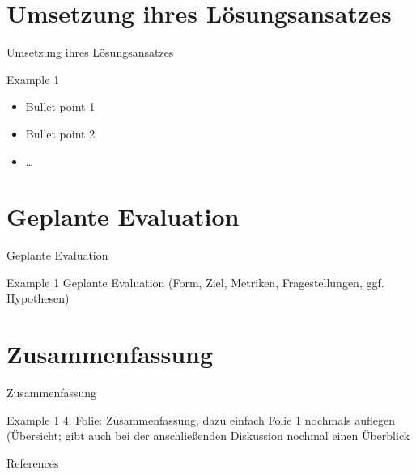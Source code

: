 \documentclass[18pt]{beamer}
\begin{document}
\section{Umsetzung ihres Lösungsansatzes}
\begin{frame}{Umsetzung ihres Lösungsansatzes}
\begin{exampleblock}{Example 1}
\begin{itemize}
\item Bullet point 1
\item Bullet point 2
\item \dots
\end{itemize}
\end{exampleblock}
\end{frame}


\section{Geplante Evaluation}
\begin{frame}{Geplante Evaluation}
\begin{exampleblock}{Example 1}
Geplante Evaluation (Form, Ziel, Metriken, Fragestellungen, ggf. Hypothesen)
\end{exampleblock}
\end{frame}

\section{Zusammenfassung}
\begin{frame}{Zusammenfassung}
\begin{exampleblock}{Example 1}
4. Folie: Zusammenfassung, dazu einfach Folie 1 nochmals auflegen (Übersicht; gibt auch bei der anschließenden Diskussion nochmal einen Überblick
\end{exampleblock}
\end{frame}

\appendix
\beginbackup

\begin{frame}[allowframebreaks]{References}
\printbibliography
\end{frame}

\backupend
\end{document}
